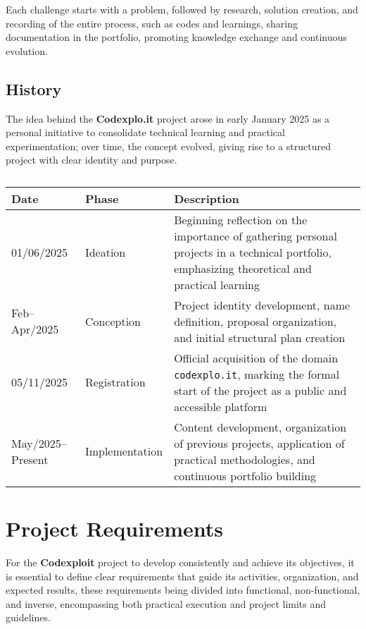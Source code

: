 \documentclass[10pt, a4paper, oneside]{article}
\begin{document}
Each challenge starts with a problem, followed by research, solution creation, and recording of the entire process, such as codes and learnings, sharing documentation in the portfolio, promoting knowledge exchange and continuous evolution.

\subsection{History}

The idea behind the \textbf{Codexplo.it} project arose in early January 2025 as a personal initiative to consolidate technical learning and practical experimentation; over time, the concept evolved, giving rise to a structured project with clear identity and purpose.

\begin{table}[ht]
    \centering
    \setlength\tabcolsep{6pt}
    \begin{tabular}{ |l|l|p{6.8cm}| }
        \hline
        \bfseries Date & \bfseries Phase & \bfseries Description \\
        \hline
        01/06/2025 & Ideation & Beginning reflection on the importance of gathering personal projects in a technical portfolio, emphasizing theoretical and practical learning \\
        \hline
        Feb–Apr/2025 & Conception & Project identity development, name definition, proposal organization, and initial structural plan creation \\
        \hline
        05/11/2025 & Registration & Official acquisition of the domain \texttt{codexplo.it}, marking the formal start of the project as a public and accessible platform \\
        \hline
        May/2025–Present & Implementation & Content development, organization of previous projects, application of practical methodologies, and continuous portfolio building \\
        \hline
    \end{tabular}
    \caption{\fontsize{10pt}{11pt}}
    \label{table:history}
\end{table}
\newpage

\section{Project Requirements}

For the \textbf{Codexploit} project to develop consistently and achieve its objectives, it is essential to define clear requirements that guide its activities, organization, and expected results, these requirements being divided into functional, non-functional, and inverse, encompassing both practical execution and project limits and guidelines.
\end{document}

